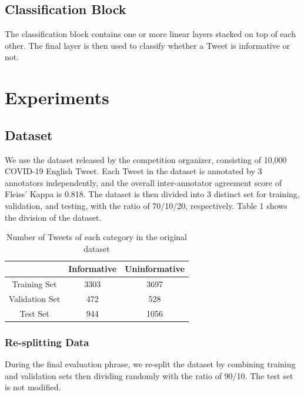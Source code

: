 \documentclass[11pt,a4paper]{article}
\begin{document}
\subsection{Classification Block}
The classification block contains one or more linear layers stacked on top of each other. The final layer is then used to classify whether a Tweet is informative or not.

\section{Experiments}
\subsection{Dataset}
We use the dataset released by the competition organizer, consisting of 10,000 COVID-19 English Tweet. Each Tweet in the dataset is annotated by 3 annotators independently, and the overall inter-annotator agreement score of Fleiss' Kappa is 0.818. The dataset is then divided into 3 distinct set for training, validation, and testing, with the ratio of 70/10/20, respectively. Table 1 shows the division of the dataset.

\begin{table}[ht]
    \centering
    \begin{tabular}{|c|c|c|}
        \hline
         & \bf{Informative} & \bf{Uninformative} \\ \hline
        Training Set & 3303 & 3697 \\ \hline
        Validation Set & 472 & 528 \\ \hline
        Test Set & 944 & 1056 \\ \hline
    \end{tabular}
    \caption{Number of Tweets of each category in the original dataset}
    \label{tab:Dataset}
\end{table}

\subsubsection{Re-splitting Data}
During the final evaluation phrase, we re-split the dataset by combining training and validation sets then dividing randomly with the ratio of 90/10. The test set is not modified.

\end{document}
